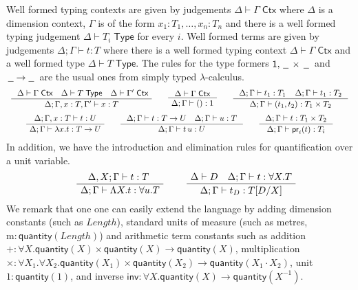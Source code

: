 \documentclass[a4paper,UKenglish]{lipics}
\newcommand{\ra}{\rightarrow}
\newcommand{\msf}[1]{\mathsf{#1}} %
\newcommand{\blank}{\, \underline{\hspace{2mm}} \,}
\newcommand{\num}{\msf{quantity}}
\newcommand{\length}{\mathit{Length}}
\newcommand{\cj}[2]{#1 \vdash #2 \; \msf{ Ctx}}
\newcommand{\Tj}[2]{#1 \vdash #2 \; \msf{ Type}}
\newcommand{\tj}[4]{#1;#2 \vdash #3 : #4}
\newcommand{\proj}{\mathsf{pr}}
\newcommand{\pack}[2]{\mathsf{pack}(#1,#2)}
\newcommand{\unpack}[4]{\mathsf{unpack}\,#1\,\mathsf{as}\,(#2,#3)\,\mathsf{in}\,#4}
\newcommand{\Dim}{D}
\newcommand{\Dvar}{X}
\begin{document}
Well formed typing contexts are given by judgements
$\cj\Delta\Gamma $ where $\Delta$ is a dimension context, $\Gamma$ is
of the form ${x_1 : T_1, \ldots, x_n:T_n}$ and there is a well formed
typing judgement $\Tj\Delta{ T_i}$ for every $i$. Well formed terms
are given by judgements $\tj \Delta \Gamma t T$ where there is a
well formed typing context $\cj \Delta \Gamma$ and
a well formed type $\Tj \Delta T $. The rules for
the type formers $\msf{1}, \blank\times\blank$ and $\blank \! \ra \! \blank$ are the usual ones from
simply typed $\lambda$-calculus.
\[\begin{array}{c}
\AxiomC{
$\cj \Delta\Gamma\quad
\Tj\Delta T\quad
\cj\Delta {\Gamma'}$}
\UnaryInfC
{$\tj \Delta{\Gamma,x:T,\Gamma'}xT$}
\DisplayProof
\qquad
\AxiomC{
$\cj\Delta {\Gamma}
$
}
\UnaryInfC
{$\tj \Delta{\Gamma}{()}1$}
\DisplayProof
\qquad
\AxiomC{
$
\tj\Delta {\Gamma} {t_1}{T_1} \; \; \; \;
\tj\Delta {\Gamma} {t_1}{T_2}
$
}
\UnaryInfC
{$\tj \Delta{\Gamma}{(t_1,t_2)}{T_1\times T_2}$}
\DisplayProof
\\[5mm]
\AxiomC{
$
\tj\Delta {\Gamma,x:T} {t}{U}
$
}
\UnaryInfC
{$\tj\Delta {\Gamma} {\lambda x.t}{T\to U}$}
\DisplayProof
\qquad
\AxiomC{
$
\tj\Delta {\Gamma} {t}{T\to U}\quad
\tj\Delta {\Gamma} {u}{T}
$
}
\UnaryInfC
{$\tj \Delta{\Gamma}{t\,u}U$}
\DisplayProof
\qquad
\AxiomC{
$
\tj\Delta {\Gamma} {t}{T_1\times T_2}
$
}
\UnaryInfC
{$\tj\Delta {\Gamma} {\proj_i(t)}{T_i}$}
\DisplayProof
\end{array}\]
In addition, we have the introduction and elimination rules for quantification over a unit variable.
\[\begin{array}{cc}
\hspace{5mm}
\AxiomC{$\tj{\Delta,\Dvar}\Gamma tT$ }
		\UnaryInfC{$\tj \Delta  \Gamma {\Lambda \Dvar.t} {\forall u.T}$}
		\DisplayProof

&\hspace{5mm}
\AxiomC{$\Delta \vdash \Dim \quad \tj \Delta \Gamma  t{\forall \Dvar.T}$}
	\UnaryInfC{$\tj \Delta  \Gamma {t_\Dim}{T[\Dim/\Dvar]}$}
	\DisplayProof
%
\end{array}\]
We remark that one
one can easily extend the language by adding
dimension constants (such as $\length$),
standard units of measure (such as metres, $\mathrm{m}:\num(\length)$)
and
arithmetic term constants
such as addition
$+:\forall \Dvar. \num(\Dvar)\times  \num(\Dvar) \rightarrow \num(\Dvar)$,
multiplication $\times :\forall \Dvar_1. \forall \Dvar_2. \num(\Dvar_1)\times \num(\Dvar_2) \rightarrow \num(\Dvar_1 \cdot \Dvar_2)$,
unit $1:\num(1)$,
and inverse $\mathsf{inv}:\forall \Dvar.\num(\Dvar)\to \num (\Dvar^{-1})$.
\end{document}
